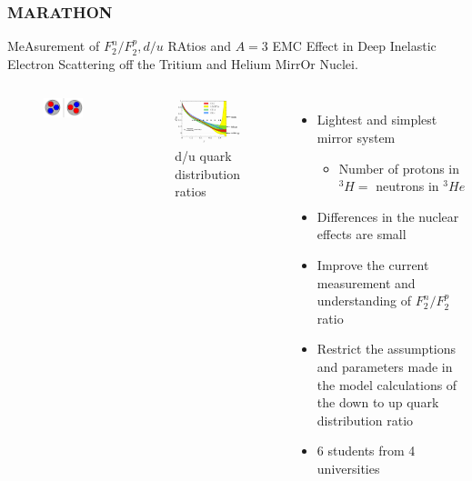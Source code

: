 \documentclass{beamer}
\begin{document}
\begin{frame}
\frametitle{MARATHON}
		MeAsurement of $F^n_2/F^p_2, d/u$ RAtios and $A=3$ EMC Effect in Deep Inelastic Electron Scattering off the Tritium and Helium MirrOr Nuclei.
	\vspace{-10pt}
	\begin{columns}[t]
	

		\begin{figure}
			\includegraphics[width =5cm]{../images/mirror}
		\end{figure}
		\vspace{-25pt}
		\begin{figure}
			\includegraphics[width=5cm]{../images/d_u}
			\caption{d/u quark distribution ratios}
		\end{figure}

		\begin{itemize}
			\item Lightest and simplest mirror system
			\begin{itemize}
				\item  Number of protons in $^3H =$ neutrons in $^3He$
	  		 \end{itemize}
			\item Differences in the nuclear effects are small
			\item Improve the current measurement and understanding of $F^n_2/F^p_2$ ratio
			\item Restrict the assumptions and parameters made in the model calculations of the down to up quark distribution ratio
			\item 6 students from 4 universities
		\end{itemize}


	\end{columns}
\end{frame}
\end{document}
